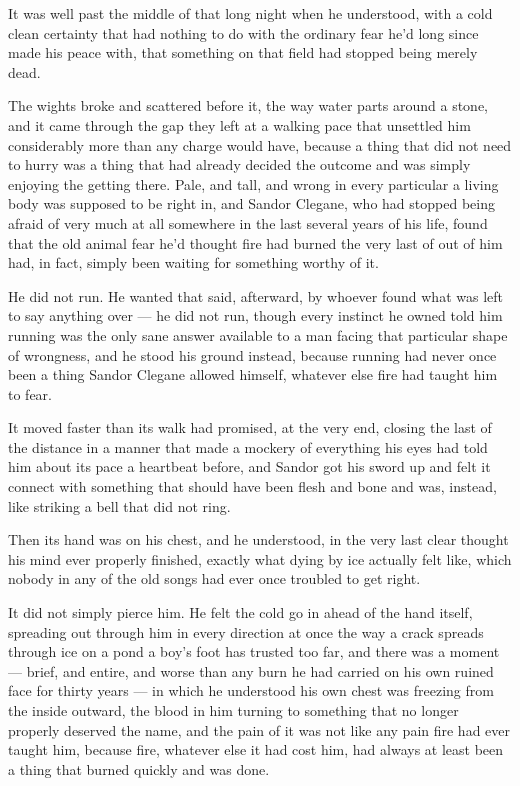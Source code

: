 \sceneBreak

It was well past the middle of that long night when he understood, with a cold clean certainty that had nothing to do with the ordinary fear he’d long since made his peace with, that something on that field had stopped being merely dead.

The wights broke and scattered before it, the way water parts around a stone, and it came through the gap they left at a walking pace that unsettled him considerably more than any charge would have, because a thing that did not need to hurry was a thing that had already decided the outcome and was simply enjoying the getting there. Pale, and tall, and wrong in every particular a living body was supposed to be right in, and Sandor Clegane, who had stopped being afraid of very much at all somewhere in the last several years of his life, found that the old animal fear he’d thought fire had burned the very last of out of him had, in fact, simply been waiting for something worthy of it.

He did not run. He wanted that said, afterward, by whoever found what was left to say anything over — he did not run, though every instinct he owned told him running was the only sane answer available to a man facing that particular shape of wrongness, and he stood his ground instead, because running had never once been a thing Sandor Clegane allowed himself, whatever else fire had taught him to fear.

\sceneBreak

It moved faster than its walk had promised, at the very end, closing the last of the distance in a manner that made a mockery of everything his eyes had told him about its pace a heartbeat before, and Sandor got his sword up and felt it connect with something that should have been flesh and bone and was, instead, like striking a bell that did not ring.

Then its hand was on his chest, and he understood, in the very last clear thought his mind ever properly finished, exactly what dying by ice actually felt like, which nobody in any of the old songs had ever once troubled to get right.

It did not simply pierce him. He felt the cold go in ahead of the hand itself, spreading out through him in every direction at once the way a crack spreads through ice on a pond a boy’s foot has trusted too far, and there was a moment — brief, and entire, and worse than any burn he had carried on his own ruined face for thirty years — in which he understood his own chest was freezing from the inside outward, the blood in him turning to something that no longer properly deserved the name, and the pain of it was not like any pain fire had ever taught him, because fire, whatever else it had cost him, had always at least been a thing that burned quickly and was done.

